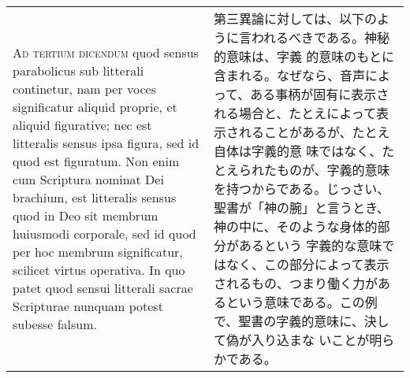 \documentclass[10pt]{jsarticle}
\begin{document}
\begin{longtable}{p{21em}p{21em}}
\\


{\scshape Ad tertium dicendum} quod sensus parabolicus sub litterali
continetur, nam per voces significatur aliquid proprie, et aliquid
figurative; nec est litteralis sensus ipsa figura, sed id quod est
figuratum. Non enim cum Scriptura nominat Dei brachium, est litteralis
sensus quod in Deo sit membrum huiusmodi corporale, sed id quod per
hoc membrum significatur, scilicet virtus operativa. In quo patet quod
sensui litterali sacrae Scripturae nunquam potest subesse falsum.


&

第三異論に対しては、以下のように言われるべきである。神秘的意味は、字義
的意味のもとに含まれる。なぜなら、音声によって、ある事柄が固有に表示さ
れる場合と、たとえによって表示されることがあるが、たとえ自体は字義的意
味ではなく、たとえられたものが、字義的意味を持つからである。じっさい、
聖書が「神の腕」と言うとき、神の中に、そのような身体的部分があるという
字義的な意味ではなく、この部分によって表示されるもの、つまり働く力があ
るという意味である。この例で、聖書の字義的意味に、決して偽が入り込まな
いことが明らかである。

\end{longtable}
\end{document}
